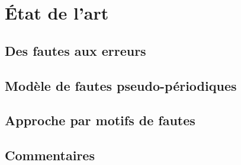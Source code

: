 \section{\'Etat de l'art}
\label{sec:contribution_environnement_edla}

\subsection{Des fautes aux erreurs}
\subsection{Modèle de fautes pseudo-périodiques}
\subsection{Approche par motifs de fautes}
\subsection{Commentaires}


